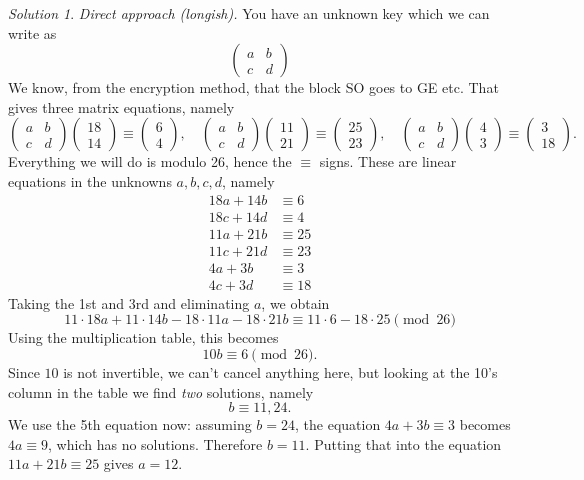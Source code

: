 \documentclass{article}
\theoremstyle{plain}
\theoremstyle{definition}
\theoremstyle{remark}
\newtheorem*{solution}{Solution}
\numberwithin{theorem}{section}
\begin{document}
\begin{solution}
\emph{Direct approach (longish).}
You have an unknown key which we can write as
\[
	\begin{pmatrix}
		a & b \\ c & d
	\end{pmatrix}
\]
We know, from the encryption method, that the block SO goes to GE etc.  That gives three matrix equations, namely
\[
	\begin{pmatrix}
		a & b \\ c & d
	\end{pmatrix}
	\begin{pmatrix}
		18 \\ 14 
	\end{pmatrix}
	\equiv
	\begin{pmatrix}
		6 \\ 4 
	\end{pmatrix}, \quad
	\begin{pmatrix}
		a & b \\ c & d
	\end{pmatrix}
	\begin{pmatrix}
		11 \\ 21 
	\end{pmatrix}
	\equiv
	\begin{pmatrix}
		25 \\ 23 
	\end{pmatrix}, \quad
	\begin{pmatrix}
		a & b \\ c & d
	\end{pmatrix}
	\begin{pmatrix}
		4 \\ 3
	\end{pmatrix}
	\equiv 
	\begin{pmatrix}
		3 \\ 18
	\end{pmatrix}.
\]
Everything we will do is modulo 26, hence the $\equiv$ signs.
These are linear equations in the unknowns $a,b,c,d$, namely
\begin{align*}
	18a+14b &\equiv 6 \\
	18c + 14d &\equiv 4 \\
	11a+21b &\equiv 25 \\
	11c + 21d &\equiv 23 \\
	4a+3b &\equiv 3 \\
	4c + 3d &\equiv 18 
\end{align*}
Taking the 1st and 3rd and eliminating $a$, we obtain
\[
	11 \cdot 18 a + 11 \cdot 14b - 18 \cdot 11 a - 18 \cdot 21b \equiv 11 \cdot 6 - 18 \cdot 25 \pmod{26}
\]
Using the multiplication table, this becomes
\[
	10b \equiv 6 \pmod{26}.
\]
Since $10$ is not invertible, we can't cancel anything here, but looking at the 10's column in the table we find \emph{two} solutions, namely
\[
	b \equiv 11, 24.
\]
We use the 5th equation now:  assuming $b=24$, the equation $4a + 3b \equiv 3$ becomes $4a \equiv 9$, which has no solutions.  Therefore $b=11$.  Putting that into the equation $11a+21b \equiv 25$ gives $a=12$.


\end{solution}
\end{document}
